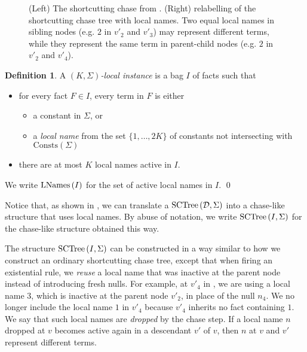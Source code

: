 \documentclass[12pt]{report}
\theoremstyle{plain}
\theoremstyle{definition}
\newtheorem{definition}[theorem]{Definition}
\def\Consts{{\mathrm{Consts}}}
\newcommand{\SCTree}[2]{\ensuremath{\normalfont{\textrm{SCTree}} \left( #1, #2 \right)}}
\newcommand{\LNames}[1]{\ensuremath{\normalfont{\textrm{LNames}} \left( #1 \right)}}
\begin{document}
\begin{figure}[ht]
  \centering
  
  \caption{(Left) The shortcutting chase from . (Right) relabelling of the shortcutting chase tree with local names. Two equal local names in sibling nodes (e.g. $2$ in $v'_2$ and $v'_3$) may represent different terms, while they represent the same term in parent-child nodes (e.g. $2$ in $v'_2$ and $v'_4$).}
  \label{sctree-simple-example-local-names}
\end{figure}

\begin{definition}
  A \emph{$(K, \Sigma)$-local instance} is a bag $I$ of facts such that
  \begin{itemize}
    \item for every fact $F \in I$, every term in $F$ is either
    \begin{itemize}
      \item a constant in $\Sigma$, or
      \item a \emph{local name} from the set $\{ 1, \ldots, 2K \}$ of constants not intersecting with $\Consts(\Sigma)$
    \end{itemize}
    \item there are at most $K$ local names active in $I$.
  \end{itemize}

  We write $\LNames{I}$ for the set of active local names in $I$.
  \qed
\end{definition}

Notice that, as shown in , we can translate a $\SCTree{\mathcal{D}}{\Sigma}$ into a chase-like structure that uses local names. By abuse of notation, we write $\SCTree{I}{\Sigma}$ for the chase-like structure obtained this way.

The structure $\SCTree{I}{\Sigma}$ can be constructed in a way similar to how we construct an ordinary shortcutting chase tree, except that when firing an existential rule, we \emph{reuse} a local name that was inactive at the parent node instead of introducing fresh nulls. For example, at $v'_4$ in , we are using a local name $3$, which is inactive at the parent node $v'_2$, in place of the null $n_4$. We no longer include the local name $1$ in $v'_4$ because $v'_4$ inherits no fact containing $1$. We say that such local names are \emph{dropped} by the chase step. If a local name $n$ dropped at $v$ becomes active again in a descendant $v'$ of $v$, then $n$ at $v$ and $v'$ represent different terms.
\end{document}
